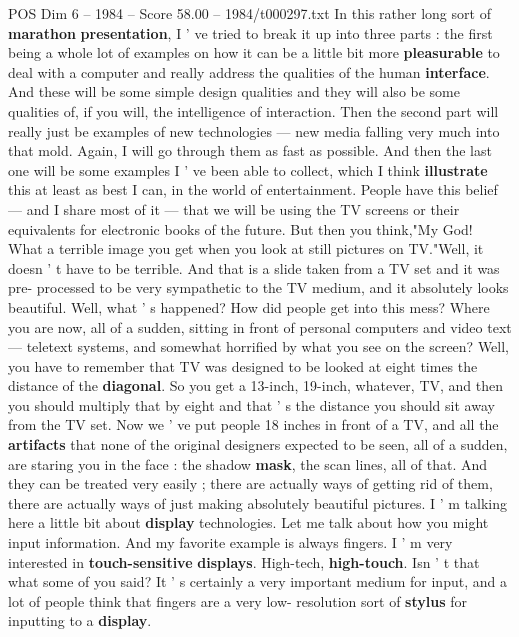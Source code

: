 \begin{textsample}{POS Dim 6 – 1984 – Score 58.00 – 1984/t000297.txt}  \label{ex:f6_pos_001}
In this rather long sort of \textbf{marathon} \textbf{presentation}, I ' ve tried to break it up into three parts : the first being a whole lot of examples on how it can be a little bit more \textbf{pleasurable} to deal with a computer and really address the qualities of the human \textbf{interface}.
And these will be some simple design qualities and they will also be some qualities of, if you will, the intelligence of interaction.
Then the second part will really just be examples of new technologies — new media falling very much into that mold.
Again, I will go through them as fast as possible.
And then the last one will be some examples I ' ve been able to collect, which I think \textbf{illustrate} this at least as best I can, in the world of entertainment.
People have this belief — and I share most of it — that we will be using the TV screens or their equivalents for electronic books of the future.
But then you think,"My God!
What a terrible image you get when you look at still pictures on TV."Well, it doesn ' t have to be terrible.
And that is a slide taken from a TV set and it was pre- processed to be very sympathetic to the TV medium, and it absolutely looks beautiful.
Well, what ' s happened?
How did people get into this mess?
Where you are now, all of a sudden, sitting in front of personal computers and video text — teletext systems, and somewhat horrified by what you see on the screen?
Well, you have to remember that TV was designed to be looked at eight times the distance of the \textbf{diagonal}.
So you get a 13-inch, 19-inch, whatever, TV, and then you should multiply that by eight and that ' s the distance you should sit away from the TV set.
Now we ' ve put people 18 inches in front of a TV, and all the \textbf{artifacts} that none of the original designers expected to be seen, all of a sudden, are staring you in the face : the shadow \textbf{mask}, the scan lines, all of that.
And they can be treated very easily ; there are actually ways of getting rid of them, there are actually ways of just making absolutely beautiful pictures.
I ' m talking here a little bit about \textbf{display} technologies.
Let me talk about how you might input information.
And my favorite example is always fingers.
I ' m very interested in \textbf{touch-sensitive} \textbf{displays}.
High-tech, \textbf{high-touch}.
Isn ' t that what some of you said?
It ' s certainly a very important medium for input, and a lot of people think that fingers are a very low- resolution sort of \textbf{stylus} for inputting to a \textbf{display}.

\end{textsample}
